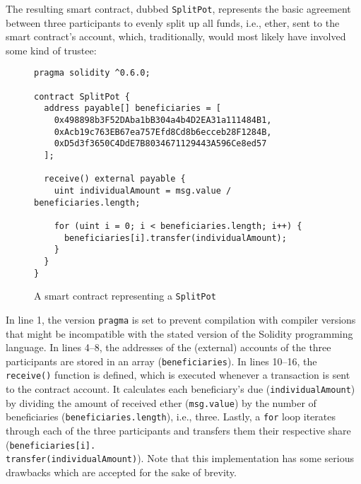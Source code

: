 The resulting smart contract, dubbed \texttt{SplitPot}, represents the basic agreement between three participants to evenly split up all funds, i.e., ether, sent to the smart contract's account, which, traditionally, would most likely have involved some kind of trustee:
\\
\begin{figure}[H]
\begin{lstlisting}
pragma solidity ^0.6.0;

contract SplitPot {
  address payable[] beneficiaries = [
    0x498898b3F52DAba1bB304a4b4D2EA31a111484B1,
    0xAcb19c763EB67ea757Efd8Cd8b6ecceb28F1284B,
    0xD5d3f3650C4DdE7B8034671129443A596Ce8ed57
  ];

  receive() external payable {
    uint individualAmount = msg.value / beneficiaries.length;
    
    for (uint i = 0; i < beneficiaries.length; i++) {
      beneficiaries[i].transfer(individualAmount);
    }
  }
}
\end{lstlisting}
\caption*{A smart contract representing a \texttt{SplitPot}}
\end{figure}

% 
% 
%     

In line 1, the version \texttt{pragma} is set to prevent compilation with compiler versions that might be incompatible with the stated version of the Solidity programming language.
In lines 4--8, the addresses of the (external) accounts of the three participants are stored in an array (\texttt{beneficiaries}).
In lines 10--16, the \texttt{receive()} function is defined, which is executed whenever a transaction is sent to the contract account.
It calculates each beneficiary's due (\texttt{individualAmount}) by dividing the amount of received ether (\texttt{msg.value}) by the number of beneficiaries (\texttt{beneficiaries.length}), i.e., three.
Lastly, a \texttt{for} loop iterates through each of the three participants and transfers them their respective share (\texttt{beneficiaries[i].\\transfer(individualAmount)}).
Note that this implementation has some serious drawbacks which are accepted for the sake of brevity.

